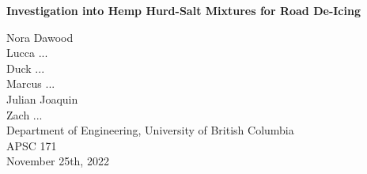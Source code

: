 \documentclass[12pt]{article}
\begin{document}
  \begin{center}
    \vspace*{\fill}

    \textbf{Investigation into Hemp Hurd-Salt Mixtures for Road De-Icing}
    \vspace{4em}

    Nora Dawood \\
    Lucca ... \\
    Duck ... \\
    Marcus ... \\
    Julian Joaquin \\
    Zach ... \\
    Department of Engineering, University of British Columbia \\
    APSC 171 \\
    November 25th, 2022

    \vspace*{\fill}
  \end{center}
  \newpage

  

  

  

  

  

  

  \printbibliography
\end{document}
